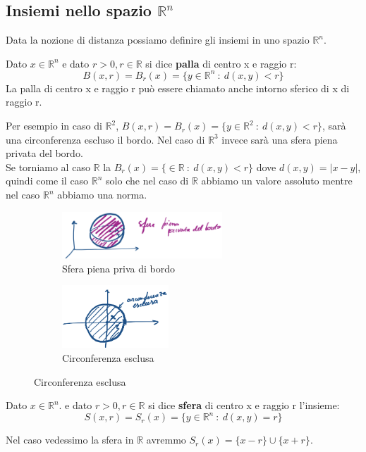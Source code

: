 \subsection{Insiemi nello spazio $\mathbb{R}^n$}
Data la nozione di distanza possiamo definire gli insiemi in uno spazio $\mathbb{R}^n$.
\begin{definition}[Palla]
Dato $x \in \mathbb{R}^n$ e dato $r > 0, r \in \mathbb{R}$ si dice \textbf{palla} di centro x e raggio r:
\[B(x,r) = B_r(x) = \{y \in \mathbb{R}^n \::\: d(x,y) < r\}\]
La palla di centro x e raggio r può essere chiamato anche intorno sferico di x di raggio r.
\end{definition}
\hspace{-15pt}Per esempio in caso di $\mathbb{R}^2$, $B(x,r) = B_r(x) = \{y \in \mathbb{R}^2 \::\: d(x,y) < r\}$, sarà una circonferenza escluso il bordo. Nel caso di $\mathbb{R}^3$ invece sarà una sfera piena privata del bordo.\\
Se torniamo al caso $\mathbb{R}$ la $B_r(x) = \{\in \mathbb{R} \::\: d(x,y) < r\}$ dove $d(x,y) = |x-y|$, quindi come il caso $\mathbb{R}^n$ solo che nel caso di $\mathbb{R}$ abbiamo un valore assoluto mentre nel caso $\mathbb{R}^n$ abbiamo una norma.

\begin{figure}[h!]
\centering
\begin{subfigure}{.45\textwidth}
    \centering
    \includegraphics[width=6cm]{images/sfera-piena-priva-bordo.png}
    \caption{Sfera piena priva di bordo}
\end{subfigure}
\begin{subfigure}{.45\textwidth}
    \centering
    \includegraphics[width=4cm]{images/circonferenza-esclusa.png}
    \caption{Circonferenza esclusa}
\end{subfigure}
\end{figure}

\begin{definition}[Sfera]
Dato $x \in \mathbb{R}^n$. e dato $r > 0, r \in \mathbb{R}$ si dice \textbf{sfera} di centro x e raggio r l'insieme:
\[S(x,r) = S_r(x) = \{y \in \mathbb{R}^n \::\: d(x,y) = r\}\]
\end{definition}
\hspace{-15pt}Nel caso vedessimo la sfera in $\mathbb{R}$ avremmo $S_r(x) = \{x-r\} \cup \{x + r\}$.

